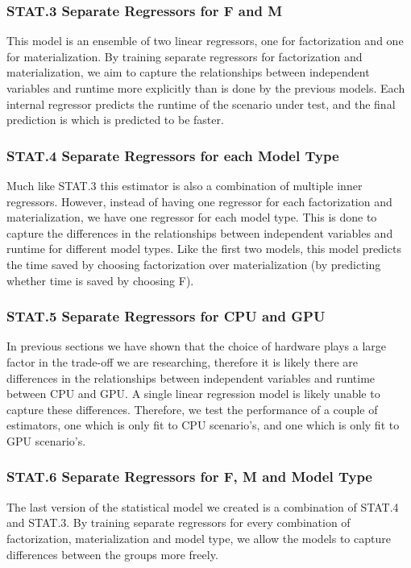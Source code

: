 \subsubsection*{STAT.3 Separate Regressors for F and M}
This model is an ensemble of two linear regressors, one for factorization and one for materialization. By training separate regressors for factorization and materialization, we aim to capture the relationships between independent variables and runtime more explicitly than is done by the previous models. Each internal regressor predicts the runtime of the scenario under test, and the final prediction is which is predicted to be faster.

\subsubsection*{STAT.4 Separate Regressors for each Model Type}
Much like STAT.3 this estimator is also a combination of multiple inner regressors. However, instead of having one regressor for each factorization and materialization, we have one regressor for each model type. This is done to capture the differences in the relationships between independent variables and runtime for different model types. Like the first two models, this model predicts the time saved by choosing factorization over materialization (by predicting whether time is saved by choosing F).

\subsubsection*{STAT.5 Separate Regressors for CPU and GPU}
In previous sections we have shown that the choice of hardware plays a large factor in the trade-off we are researching, therefore it is likely there are differences in the relationships between independent variables and runtime between CPU and GPU. A single linear regression model is likely unable to capture these differences. Therefore, we test the performance of a couple of estimators, one which is only fit to CPU scenario's, and one which is only fit to GPU scenario's.

\subsubsection*{STAT.6 Separate Regressors for F, M and Model Type}
The last version of the statistical model we created is a combination of STAT.4 and STAT.3. By training separate regressors for every combination of factorization, materialization and model type, we allow the models to capture differences between the groups more freely.

